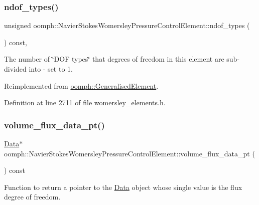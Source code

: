 \subsubsection{\texorpdfstring{ndof\+\_\+types()}{ndof\_types()}}
{\footnotesize\ttfamily unsigned oomph\+::\+Navier\+Stokes\+Womersley\+Pressure\+Control\+Element\+::ndof\+\_\+types (\begin{DoxyParamCaption}{ }\end{DoxyParamCaption}) const\hspace{0.3cm}{\ttfamily [inline]}, {\ttfamily [virtual]}}



The number of \char`\"{}\+D\+O\+F types\char`\"{} that degrees of freedom in this element are sub-\/divided into -\/ set to 1. 



Reimplemented from \hyperlink{classoomph_1_1GeneralisedElement_a0c6037a870597b35dcf1c780710b9a56}{oomph\+::\+Generalised\+Element}.



Definition at line 2711 of file womersley\+\_\+elements.\+h.

\mbox{\label{classoomph_1_1NavierStokesWomersleyPressureControlElement_a091e01b1894fc97c8cca758f9c6cc121}} 
\subsubsection{\texorpdfstring{volume\+\_\+flux\+\_\+data\+\_\+pt()}{volume\_flux\_data\_pt()}}
{\footnotesize\ttfamily \hyperlink{classoomph_1_1Data}{Data}$\ast$ oomph\+::\+Navier\+Stokes\+Womersley\+Pressure\+Control\+Element\+::volume\+\_\+flux\+\_\+data\+\_\+pt (\begin{DoxyParamCaption}{ }\end{DoxyParamCaption}) const\hspace{0.3cm}{\ttfamily [inline]}}



Function to return a pointer to the \hyperlink{classoomph_1_1Data}{Data} object whose single value is the flux degree of freedom. 




